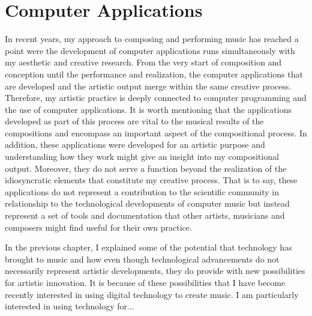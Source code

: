\hypertarget{chapter4}{}
\chapter{Computer Applications}

In recent years, my approach to composing and performing music has reached a point were the development of computer applications runs simultaneously with my aesthetic and creative research. From the very start of composition and conception until the performance and realization, the computer applications that are developed and the artistic output merge within the same creative process. Therefore, my artistic practice is deeply connected to computer programming and the use of computer applications. It is worth mentioning that the applications developed as part of this process are vital to the musical results of the compositions and encompass an important aspect of the compositional process. In addition, these applications were developed for an artistic purpose and understanding how they work might give an insight into my compositional output. Moreover, they do not serve a function beyond the realization of the idiosyncratic elements that constitute my creative process. That is to say, these applications do not represent a contribution to the scientific community in relationship to the technological developments of computer music but instead represent a set of tools and documentation that other artists, musicians and composers might find useful for their own practice.

In the previous chapter, I explained some of the potential that technology has brought to music and how even though technological advancements do not necessarily represent artistic developments, they do provide with new possibilities for artistic innovation. It is because of these possibilities that I have become recently interested in using digital technology to create music. I am particularly interested in using technology for... 
 
